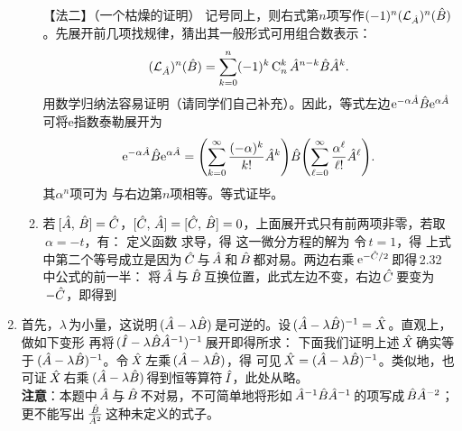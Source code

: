 \begin{enumerate}[label=2.\arabic*, leftmargin=-0.5mm]
\begin{enumerate}[label=(\arabic*)]
【法二】（一个枯燥的证明）%
记号同上，则右式第$n$项写作$(-1)^n(\mathcal{L}_{\hat{A}})^n(\hat{B})$。先展开前几项找规律，猜出其一般形式可用组合数表示：
\[(\mathcal{L}_{\hat{A}})^n(\hat{B}) = \sum_{k=0}^{n}(-1)^k \,\mathrm{C}_n^k\, \hat{A}^{n-k}\hat{B}\hat{A}^{k}.\]
用数学归纳法容易证明（请同学们自己补充）。因此，等式左边$\mathrm{e}^{-\alpha\hat{A}}\hat{B}\mathrm{e}^{\alpha\hat{A}}$可将e指数泰勒展开为
\[\mathrm{e}^{-\alpha\hat{A}}\hat{B}\mathrm{e}^{\alpha\hat{A}} = \qty(\sum_{k=0}^{\infty}\frac{(-\alpha)^k}{k!}\hat{A}^k)\hat{B} \qty(\sum_{\ell=0}^{\infty}\frac{\alpha^\ell}{\ell!}\hat{A}^\ell).\]
其$\alpha^n$项可为
与右边第$n$项相等。等式证毕。
\item
若$\,[\hat{A},\,\hat{B}]=\hat{C}$，$[\hat{C},\,\hat{A}]=[\hat{C},\,\hat{B}]=0$，上面展开式只有前两项非零，若取$\,\alpha=-t$，有：
定义函数
求导，得
这一微分方程的解为
令$\,t=1$，得
上式中第二个等号成立是因为$\,\hat{C}\,$与$\,\hat{A}\,$和$\,\hat{B}\,$都对易。两边右乘$\,\mathrm{e}^{-\hat{C}/2}\,$即得\,2.32\,中公式的前一半：
将$\,\hat{A}\,$与$\,\hat{B}\,$互换位置，此式左边不变，右边$\,\hat{C}\,$要变为$\,-\hat{C}$，即得到
\end{enumerate}

\item
首先，$\lambda\,$为小量，这说明$\,(\hat{A}-\lambda\hat{B})\,$是可逆的。设$\,(\hat{A}-\lambda\hat{B})^{-1}=\hat{X}$。直观上，做如下变形
\alg{\hX=((\hI-\lambda\hB\hA\inv)\hA)\inv=\hA\inv(\hI-\lambda\hB\hA\inv)\inv}
再将$\,(\hat{I}-\lambda\hat{B}\hat{A}^{-1})^{-1}\,$展开即得所求：
下面我们证明上述$\,\hat{X}\,$确实等于$\,(\hat{A}-\lambda\hat{B})^{-1}$。令$\,\hat{X}\,$左乘$\,(\hat{A}-\lambda\hat{B})$，得
可见$\,\hat{X}=(\hat{A}-\lambda\hat{B})^{-1}$。类似地，也可证$\,\hat{X}\,$右乘$\,(\hat{A}-\lambda\hat{B})\,$得到恒等算符$\,\hat{I}$，此处从略。\\
{\color{red}\textbf{注意}：本题中$\,\hat{A}\,$与$\,\hat{B}\,$不对易，不可简单地将形如$\,\hat{A}^{-1}\hat{B}\hat{A}^{-1}\,$的项写成$\,\hat{B}\hat{A}^{-2}$；更不能写出$\,\frac{\hat{B}}{\hat{A}^{2}}\,$这种未定义的式子。}


\end{enumerate}
